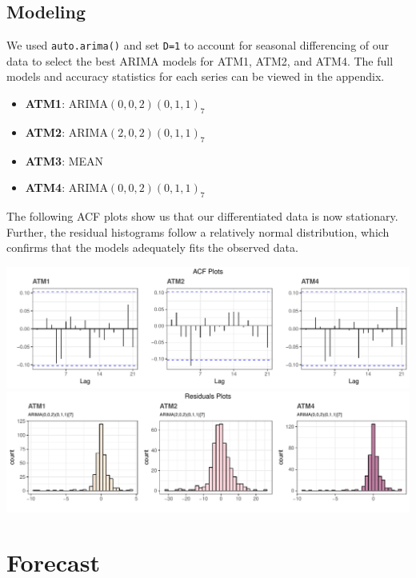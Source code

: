 \documentclass[openany]{book}
\providecommand{\tightlist}{%
  \setlength{\itemsep}{0pt}\setlength{\parskip}{0pt}}
\begin{document}
\hypertarget{modeling}{%
\subsection{Modeling}\label{modeling}}

We used \texttt{auto.arima()} and set \texttt{D=1} to account for
seasonal differencing of our data to select the best ARIMA models for
ATM1, ATM2, and ATM4. The full models and accuracy statistics for each
series can be viewed in the appendix.

\begin{itemize}
\tightlist
\item
  \textbf{ATM1}: ARIMA\((0,0,2)(0,1,1)_7\)
\item
  \textbf{ATM2}: ARIMA\((2,0,2)(0,1,1)_7\)
\item
  \textbf{ATM3}: MEAN
\item
  \textbf{ATM4}: ARIMA\((0,0,2)(0,1,1)_7\)
\end{itemize}

The following ACF plots show us that our differentiated data is now
stationary. Further, the residual histograms follow a relatively normal
distribution, which confirms that the models adequately fits the
observed data.

\includegraphics{Part-A-JM_JO_files/figure-latex/unnamed-chunk-7-1.pdf}
\includegraphics{Part-A-JM_JO_files/figure-latex/unnamed-chunk-7-2.pdf}

\hypertarget{forecast}{%
\section{Forecast}\label{forecast}}
\end{document}
